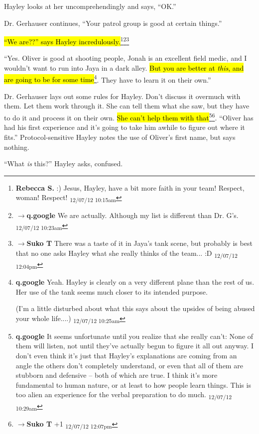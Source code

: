 Hayley looks at her uncomprehendingly and says, ``OK.''

Dr. Gerhauser continues, ``Your patrol group is good at certain things.''

\hl{``We are??'' says Hayley incredulously.}\footnote{\textbf{Rebecca S. }:) Jesus, Hayley, have a bit more faith in your team! Respect, woman! Respect! \textsubscript{12/07/12 10:15am}}\footnote{$\rightarrow$\textbf{q.google }We are actually.  Although my list is different than Dr. G's. \textsubscript{12/07/12 10:23am}}\footnote{$\rightarrow$\textbf{Suko T }There was a taste of it in Jaya's tank scene, but probably is best that no one asks Hayley what she really thinks of the team... :D \textsubscript{12/07/12 12:04pm}}

``Yes.  Oliver is good at shooting people, Jonah is an excellent field medic, and I wouldn't want to run into Jaya in a dark alley.  \hl{But you are better at \textit{this}, and are going to be for some time}\footnote{\textbf{q.google }Yeah.  Hayley is clearly on a very different plane than the rest of us.  Her use of the tank seems much closer to its intended purpose.

(I'm a little disturbed about what this says about the upsides of being abused your whole life....) \textsubscript{12/07/12 10:25am}}.  They have to learn it on their own.''



Dr. Gerhauser lays out some rules for Hayley.  Don't discuss it overmuch with them.  Let them work through it.  She can tell them what she saw, but they have to do it and process it on their own. \hl{She can't help them with that}\footnote{\textbf{q.google }It seems unfortunate until you realize that she really can't: None of them will listen, not until they've actually begun to figure it all out anyway.  I don't even think it's just that Hayley's explanations are coming from an angle the others don't completely understand, or even that all of them are stubborn and defensive -- both of which are true.  I think it's more fundamental to human nature, or at least to how people learn things.  This is too alien an experience for the verbal preparation to do much. \textsubscript{12/07/12 10:29am}}\footnote{$\rightarrow$\textbf{Suko T }+1 \textsubscript{12/07/12 12:07pm}}.  ``Oliver has had his first experience and it's going to take him awhile to figure out where it fits.''  Protocol-sensitive Hayley notes the use of Oliver's first name, but says nothing.



``What \textit{is} this?'' Hayley asks, confused.

